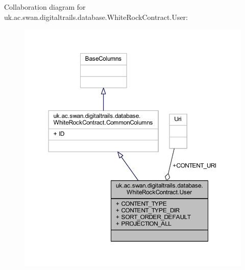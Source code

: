Collaboration diagram for uk.\+ac.\+swan.\+digitaltrails.\+database.\+White\+Rock\+Contract.\+User\+:
\nopagebreak
\begin{figure}[H]
\begin{center}
\leavevmode
\includegraphics[width=350pt]{classuk_1_1ac_1_1swan_1_1digitaltrails_1_1database_1_1_white_rock_contract_1_1_user__coll__graph}
\end{center}
\end{figure}
